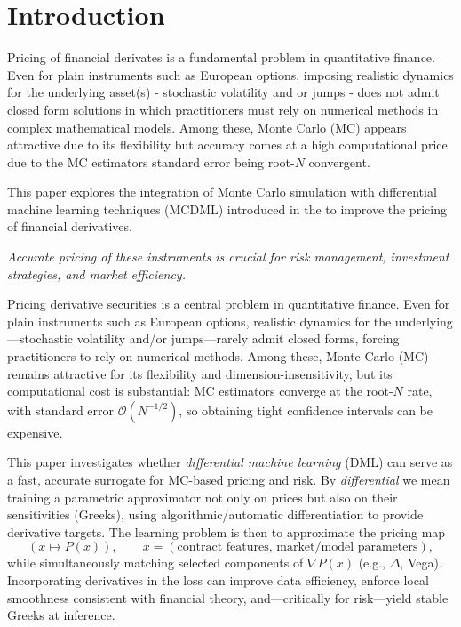 \section{Introduction}

Pricing of financial derivates is a fundamental problem in quantitative finance. Even for plain instruments such as European options, imposing realistic dynamics for the underlying asset(s) - stochastic volatility and or jumps - does not admit closed form solutions in which practitioners must rely on numerical methods in complex mathematical models. Among these, Monte Carlo (MC) appears attractive due to its flexibility but accuracy comes at a high computational price due to the MC estimators standard error being root-$N$ convergent. 

This paper explores the integration of Monte Carlo simulation with differential machine learning techniques (MCDML) introduced in the \cite{hugeDifferentialMachineLearning2020} to improve the pricing of financial derivatives.

\textit{Accurate pricing of these instruments is crucial for risk management, investment strategies, and market efficiency.} 

Pricing derivative securities is a central problem in quantitative finance. Even for plain instruments such as European options, realistic dynamics for the underlying---stochastic volatility and/or jumps---rarely admit closed forms, forcing practitioners to rely on numerical methods. Among these, Monte Carlo (MC) remains attractive for its flexibility and dimension-insensitivity, but its computational cost is substantial: MC estimators converge at the root-$N$ rate, with standard error $\mathcal{O}(N^{-1/2})$, so obtaining tight confidence intervals can be expensive.

This paper investigates whether \emph{differential machine learning} (DML) can serve as a fast, accurate surrogate for MC-based pricing and risk. By \emph{differential} we mean training a parametric approximator not only on prices but also on their sensitivities (Greeks), using algorithmic/automatic differentiation to provide derivative targets. The learning problem is then to approximate the pricing map
\[
(x \mapsto P(x)), \qquad x=(\text{contract features},\, \text{market/model parameters}),
\]
while simultaneously matching selected components of $\nabla P(x)$ (e.g., $\Delta$, Vega). Incorporating derivatives in the loss can improve data efficiency, enforce local smoothness consistent with financial theory, and---critically for risk---yield stable Greeks at inference.

